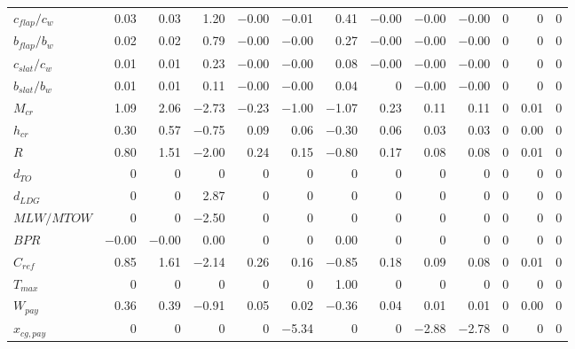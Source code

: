 \begin{longtable}{l|rrrrrrrrrrrr}
$c_{flap}/c_w$ & 0.03 & 0.03 & 1.20 & $-$0.00 & $-$0.01 & 0.41 & $-$0.00 & $-$0.00 & $-$0.00 & 0 & 0 & 0 \\
$b_{flap}/b_w$ & 0.02 & 0.02 & 0.79 & $-$0.00 & $-$0.00 & 0.27 & $-$0.00 & $-$0.00 & $-$0.00 & 0 & 0 & 0 \\
$c_{slat}/c_w$ & 0.01 & 0.01 & 0.23 & $-$0.00 & $-$0.00 & 0.08 & $-$0.00 & $-$0.00 & $-$0.00 & 0 & 0 & 0 \\
$b_{slat}/b_w$ & 0.01 & 0.01 & 0.11 & $-$0.00 & $-$0.00 & 0.04 & 0 & $-$0.00 & $-$0.00 & 0 & 0 & 0 \\
$M_{cr}$ & 1.09 & 2.06 & $-$2.73 & $-$0.23 & $-$1.00 & $-$1.07 & 0.23 & 0.11 & 0.11 & 0 & 0.01 & 0 \\
$h_{cr}$ & 0.30 & 0.57 & $-$0.75 & 0.09 & 0.06 & $-$0.30 & 0.06 & 0.03 & 0.03 & 0 & 0.00 & 0 \\
$R$ & 0.80 & 1.51 & $-$2.00 & 0.24 & 0.15 & $-$0.80 & 0.17 & 0.08 & 0.08 & 0 & 0.01 & 0 \\
$d_{TO}$ & 0 & 0 & 0 & 0 & 0 & 0 & 0 & 0 & 0 & 0 & 0 & 0 \\
$d_{LDG}$ & 0 & 0 & 2.87 & 0 & 0 & 0 & 0 & 0 & 0 & 0 & 0 & 0 \\
$MLW/MTOW$ & 0 & 0 & $-$2.50 & 0 & 0 & 0 & 0 & 0 & 0 & 0 & 0 & 0 \\
$BPR$ & $-$0.00 & $-$0.00 & 0.00 & 0 & 0 & 0.00 & 0 & 0 & 0 & 0 & 0 & 0 \\
$C_{ref}$ & 0.85 & 1.61 & $-$2.14 & 0.26 & 0.16 & $-$0.85 & 0.18 & 0.09 & 0.08 & 0 & 0.01 & 0 \\
$T_{max}$ & 0 & 0 & 0 & 0 & 0 & 1.00 & 0 & 0 & 0 & 0 & 0 & 0 \\
$W_{pay}$ & 0.36 & 0.39 & $-$0.91 & 0.05 & 0.02 & $-$0.36 & 0.04 & 0.01 & 0.01 & 0 & 0.00 & 0 \\
$x_{cg,pay}$ & 0 & 0 & 0 & 0 & $-$5.34 & 0 & 0 & $-$2.88 & $-$2.78 & 0 & 0 & 0 \\
\bottomrule
\end{longtable}